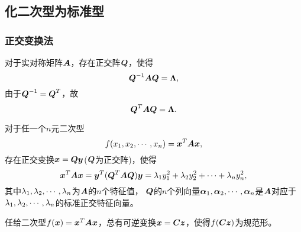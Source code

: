 \subsection{化二次型为标准型}

\begin{frame}
  
    
  
\end{frame}


\subsubsection{正交变换法}
\begin{frame}
  \begin{center}
  \end{center}
\end{frame}

\begin{frame}
  
    \begin{jielun}
      对于实对称矩阵$\A$，存在正交阵$\QQ$，使得
      $$
      \QQ^{-1}\A\QQ=\Lambdabd,
      $$
      由于$\QQ^{-1}=\QQ^T$，故
      $$
      \QQ^{T}\A\QQ=\Lambdabd.
      $$
    \end{jielun}
  
\end{frame}

\begin{frame}
  
    \begin{dingli}[主轴定理]
      对于任一个$n$元二次型
      $$
      f(x_1,x_2,\cd,x_n)=\xx^T\A\xx,
      $$
      存在正交变换$\xx=\QQ\yy$($\QQ$为正交阵)，使得
      $$
      \xx^T\A\xx=\yy^T(\QQ^T\A\QQ)\yy=\lambda_1y_1^2+\lambda_2y_2^2+\cd+\lambda_ny_n^2,
      $$
      其中$\lambda_1,\lambda_2,\cd,\lambda_n$为$\A$的$n$个特征值，
      $\QQ$的$n$个列向量$\alphabd_1,\alphabd_2,\cd,\alphabd_n$是$\A$对应于$\lambda_1,\lambda_2,\cd,\lambda_n$的标准正交特征向量。
    \end{dingli} \vspace{.2in}

    \begin{tuilun}
      任给二次型$f(\xx)=\xx^T\A\xx$，总有可逆变换$\xx=\C\zz$，使得$f(\C\zz)$为规范形。
    \end{tuilun}
\end{frame}



